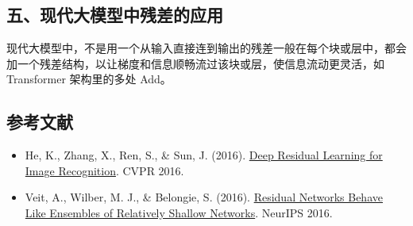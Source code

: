 \hypertarget{ux4e94ux73b0ux4ee3ux5927ux6a21ux578bux4e2dux6b8bux5deeux7684ux5e94ux7528}{%
\subsection{五、现代大模型中残差的应用}\label{ux4e94ux73b0ux4ee3ux5927ux6a21ux578bux4e2dux6b8bux5deeux7684ux5e94ux7528}}

现代大模型中，不是用一个从输入直接连到输出的残差一般在每个块或层中，都会加一个残差结构，以让梯度和信息顺畅流过该块或层，使信息流动更灵活，如 Transformer 架构里的多处 Add。

\FloatBarrier
{}
\hypertarget{ux53c2ux8003ux6587ux732e-14}{%
\subsection{参考文献}\label{ux53c2ux8003ux6587ux732e-14}}

\vspace{0.25em}
\begin{itemize}
\tightlist
\item
  He, K., Zhang, X., Ren, S., \& Sun, J. (2016). \href{https://arxiv.org/abs/1512.03385}{Deep Residual Learning for Image Recognition}. CVPR 2016.
\item
  Veit, A., Wilber, M. J., \& Belongie, S. (2016). \href{https://proceedings.neurips.cc/paper_files/paper/2016/hash/37bc2f75bf1bcfe8450a1a41c200364c-Abstract.html}{Residual Networks Behave Like Ensembles of Relatively Shallow Networks}. NeurIPS 2016.
\end{itemize}

\clearpage
